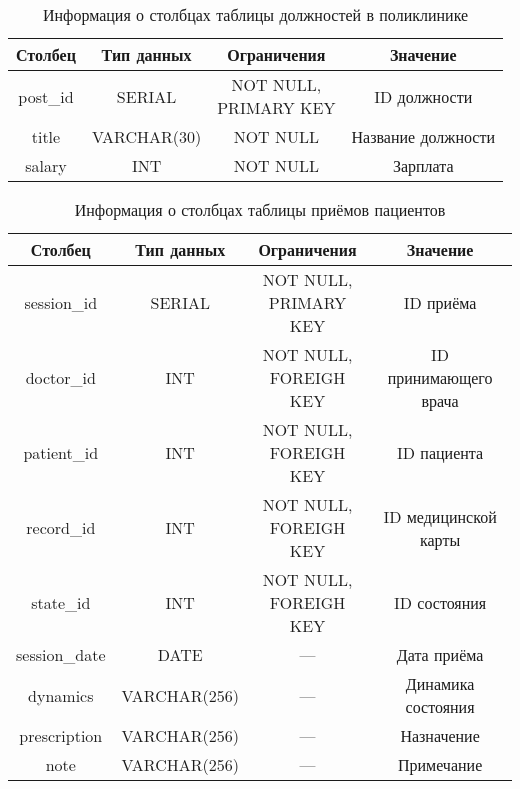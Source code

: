 \begin{table}[h!]
\begin{center}
	\captionsetup{justification=raggedright,singlelinecheck=off,margin=5mm}
	\caption{Информация о столбцах таблицы должностей в поликлинике}
	\begin{tabular}{| c | c | c | c |}
		\hline
		Столбец & Тип данных & Ограничения & Значение \\
		\hline
		post\_id & SERIAL & \makecell{NOT NULL, \\ PRIMARY KEY} & ID должности \\
		\hline
		title & VARCHAR(30) & NOT NULL & Название должности \\
		\hline
		salary & INT & NOT NULL & Зарплата \\
		\hline
	\end{tabular}
	\label{table:posts-columns}
\end{center}
\end{table}

\begin{table}[h!]
\begin{center}
	\captionsetup{justification=raggedright,singlelinecheck=off,margin=5mm}
	\caption{Информация о столбцах таблицы приёмов пациентов}
	\begin{tabular}{| c | c | c | c |}
		\hline
		Столбец & Тип данных & Ограничения & Значение \\
		\hline
		session\_id & SERIAL & \makecell{NOT NULL, \\ PRIMARY KEY} & ID приёма \\
		\hline
		doctor\_id & INT & \makecell{NOT NULL, \\ FOREIGH KEY} & ID принимающего врача \\
		\hline
		patient\_id & INT &  \makecell{NOT NULL, \\ FOREIGH KEY} & ID пациента \\
		\hline
		record\_id &  INT &  \makecell{NOT NULL, \\ FOREIGH KEY} & ID медицинской карты \\
		\hline
		state\_id &  INT &  \makecell{NOT NULL, \\ FOREIGH KEY} & ID состояния\\
		\hline
		session\_date & DATE & --- & Дата приёма\\
		\hline
		dynamics & VARCHAR(256) & --- & Динамика состояния \\
		\hline
		prescription & VARCHAR(256) & --- & Назначение \\
		\hline
		note & VARCHAR(256) & --- & Примечание \\
		\hline
	\end{tabular}
	\label{table:sessions-columns}
\end{center}
\end{table}

